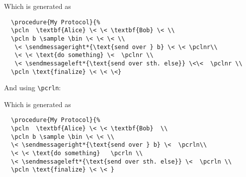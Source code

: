 \documentclass[a4paper]{report}
\begin{document}
  \begin{center}
  \end{center}
  Which is generated as
  \begin{lstlisting}
  \procedure{My Protocol}{%
  \pcln  \textbf{Alice} \< \< \textbf{Bob} \< \\
  \pcln b \sample \bin \< \< \< \\
   \< \sendmessageright*{\text{send over } b} \< \< \pclnr\\
   \< \< \text{do something} \<  \pclnr \\
   \< \sendmessageleft*{\text{send over sth. else}} \<\<  \pclnr \\
  \pcln \text{finalize} \< \< \<}
  \end{lstlisting}
  
  
  
  And using \lstinline$\pcrln$:
  \begin{center}
  \end{center}
  Which is generated as
  \begin{lstlisting}
  \procedure{My Protocol}{%
  \pcln  \textbf{Alice} \< \< \textbf{Bob}  \\
  \pcln b \sample \bin \< \< \\
  \< \sendmessageright*{\text{send over } b} \<  \pcrln\\
  \< \< \text{do something}   \pcrln \\
  \< \sendmessageleft*{\text{send over sth. else}} \<  \pcrln \\
  \pcln \text{finalize} \< \< }
  \end{lstlisting}
  
\end{document}
